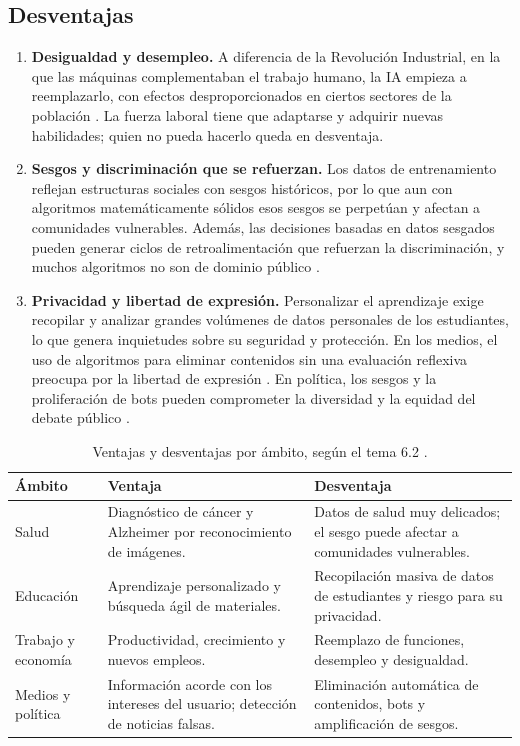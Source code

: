 \documentclass[11pt,letterpaper]{article}
\begin{document}
\subsection{Desventajas}

\begin{enumerate}
    \item \textbf{Desigualdad y desempleo.} A diferencia de la Revolución Industrial, en la que las máquinas complementaban el trabajo humano, la IA empieza a reemplazarlo, con efectos desproporcionados en ciertos sectores de la población \parencite{iae_u6_t62}. La fuerza laboral tiene que adaptarse y adquirir nuevas habilidades; quien no pueda hacerlo queda en desventaja.
    \item \textbf{Sesgos y discriminación que se refuerzan.} Los datos de entrenamiento reflejan estructuras sociales con sesgos históricos, por lo que aun con algoritmos matemáticamente sólidos esos sesgos se perpetúan y afectan a comunidades vulnerables. Además, las decisiones basadas en datos sesgados pueden generar ciclos de retroalimentación que refuerzan la discriminación, y muchos algoritmos no son de dominio público \parencite{iae_u6_t62}.
    \item \textbf{Privacidad y libertad de expresión.} Personalizar el aprendizaje exige recopilar y analizar grandes volúmenes de datos personales de los estudiantes, lo que genera inquietudes sobre su seguridad y protección. En los medios, el uso de algoritmos para eliminar contenidos sin una evaluación reflexiva preocupa por la libertad de expresión \parencite{iae_u6_t62}. En política, los sesgos y la proliferación de bots pueden comprometer la diversidad y la equidad del debate público \parencite{iae_u6_t62}.
\end{enumerate}

\begin{table}[H]
\centering
\scriptsize
\renewcommand{\arraystretch}{1.25}
\begin{tabularx}{\textwidth}{@{}p{3cm}XX@{}}
\toprule
\textbf{Ámbito} & \textbf{Ventaja} & \textbf{Desventaja} \\
\midrule
Salud & Diagnóstico de cáncer y Alzheimer por reconocimiento de imágenes. & Datos de salud muy delicados; el sesgo puede afectar a comunidades vulnerables. \\
Educación & Aprendizaje personalizado y búsqueda ágil de materiales. & Recopilación masiva de datos de estudiantes y riesgo para su privacidad. \\
Trabajo y economía & Productividad, crecimiento y nuevos empleos. & Reemplazo de funciones, desempleo y desigualdad. \\
Medios y política & Información acorde con los intereses del usuario; detección de noticias falsas. & Eliminación automática de contenidos, bots y amplificación de sesgos. \\
\bottomrule
\end{tabularx}
\caption{Ventajas y desventajas por ámbito, según el tema 6.2 \parencite{iae_u6_t62}.}\label{tab:ambitos}
\end{table}
\end{document}
